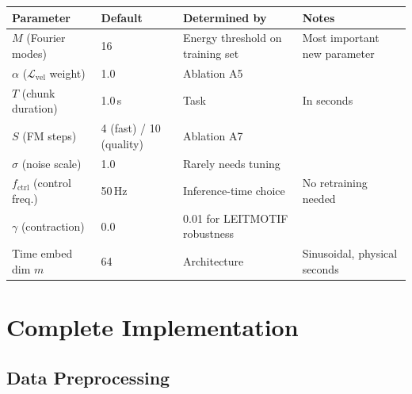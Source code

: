 \documentclass[11pt]{article}
\theoremstyle{plain}
\theoremstyle{definition}
\newcommand{\cL}{\mathcal{L}}
\begin{document}
\begin{center}
\begin{tabular}{llll}
\toprule
Parameter & Default & Determined by & Notes \\
\midrule
$M$ (Fourier modes) & 16 & Energy threshold on training set & Most important new parameter \\
$\alpha$ ($\cL_{\mathrm{vel}}$ weight) & 1.0 & Ablation A5 & \\
$T$ (chunk duration) & 1.0\,s & Task & In seconds \\
$S$ (FM steps) & 4 (fast) / 10 (quality) & Ablation A7 & \\
$\sigma$ (noise scale) & 1.0 & Rarely needs tuning & \\
$f_{\mathrm{ctrl}}$ (control freq.) & 50\,Hz & Inference-time choice & No retraining needed \\
$\gamma$ (contraction) & 0.0 & 0.01 for LEITMOTIF robustness & \\
Time embed dim $m$ & 64 & Architecture & Sinusoidal, physical seconds \\
\bottomrule
\end{tabular}
\end{center}

\section{Complete Implementation}
\label{app:impl}

\subsection{Data Preprocessing}
\end{document}
